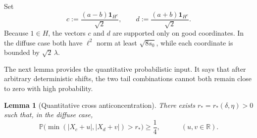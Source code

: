 \documentclass[11pt]{amsart}
\numberwithin{equation}{section}
\newtheorem{lemma}[theorem]{Lemma}
\theoremstyle{definition}
\theoremstyle{remark}
\newcommand{\Prob}{\mathbb P}
\newcommand{\R}{\mathbb R}
\newcommand{\abs}[1]{\lvert #1 \rvert}
\begin{document}
Set
\[
c:=\frac{(a-b)\mathbf 1_{H^c}}{\sqrt2},
\qquad
d:=\frac{(a+b)\mathbf 1_{H^c}}{\sqrt2}.
\]
Because $1\in H$, the vectors $c$ and $d$ are supported only on good
coordinates.  In the diffuse case both have $\ell^2$ norm at least
$\sqrt{8s_0}$, while each coordinate is bounded by $\sqrt2\,\lambda$.

The next lemma provides the quantitative probabilistic input.  It says that
after arbitrary deterministic shifts, the two tail combinations cannot both
remain close to zero with high probability.
\begin{lemma}[Quantitative cross anticoncentration]\label{lem:cross}
There exists $r_*=r_*(\delta,\eta)>0$ such that, in the diffuse case,
\[
\Prob\bigl(\min(\abs{X_c+u},\abs{X_d+v})>r_*\bigr)\ge \frac14, \quad 
\qquad(u,v\in\R).
\]
\end{lemma}
\end{document}

